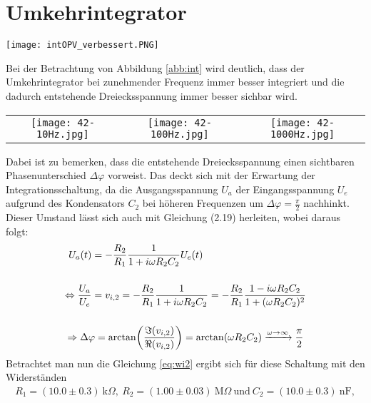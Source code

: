 

\def\weite{4cm}

\section{Umkehrintegrator}
\begin{center}
    \texttt{[image: intOPV\_verbessert.PNG]}
\end{center}
Bei der Betrachtung von Abbildung \ref{abb:int} wird deutlich, dass der Umkehrintegrator bei zunehmender Frequenz immer besser integriert und die dadurch entstehende Dreiecksspannung immer besser sichbar wird.
\begin{center}
    \begin{tabular}{c c c}
        \texttt{[image: 42-10Hz.jpg]} & \texttt{[image: 42-100Hz.jpg]} & \texttt{[image: 42-1000Hz.jpg]}
    \end{tabular}
    \label{abb:int}
\end{center}
Dabei ist zu bemerken, dass die entstehende Dreiecksspannung einen sichtbaren Phasenunterschied $\Delta\varphi$ vorweist. Das deckt sich mit der Erwartung der Integrationsschaltung, da die Ausgangsspannung $U_a$ der Eingangsspannung $U_e$ aufgrund des Kondensators $C_2$ bei höheren Frequenzen um $\Delta\varphi = \frac{\pi}{2}$ nachhinkt. Dieser Umstand lässt sich auch mit Gleichung (2.19) herleiten, wobei daraus folgt:
\begin{gather}
    \begin{aligned}
        U_a(t) &= - \frac{R_2}{R_1} \frac{1}{1+i\omega R_2 C_2} U_e(t)\\[0.5cm]
        \Leftrightarrow \frac{U_a}{U_e} &= v_{i,2} = - \frac{R_2}{R_1} \frac{1}{1+i\omega R_2 C_2} = - \frac{R_2}{R_1} \frac{1 - i\omega R_2 C_2}{1+(\omega R_2 C_2)^2}
    \end{aligned}\\[0.5cm]
    \Rightarrow \Delta\varphi = \arctan(\frac{\imaginary(v_{i,2})}{\real(v_{i,2})}) = \arctan(\omega R_2 C_2) \xrightarrow{\omega \rightarrow \infty} \frac{\pi}{2} 
\end{gather}
Betrachtet man nun die Gleichung \ref{eq:wi2} ergibt sich für diese Schaltung mit den Widerständen 
\begin{gather*}
    R_1 = (10.0 \pm 0.3)~\text{k}\Omega,~R_2 = (1.00 \pm 0.03)~\text{M}\Omega~\text{und}~C_2 = (10.0 \pm 0.3)~\text{nF},
\end{gather*}
